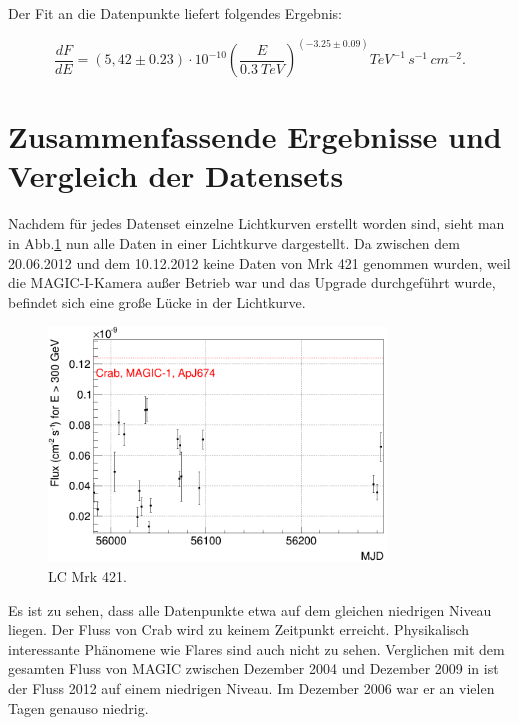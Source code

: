 Der Fit an die Datenpunkte liefert folgendes Ergebnis:

\begin{equation}
 \frac{dF}{dE}=(5,42 \pm 0.23) \cdot 10^{-10}\left( \frac{E}{\SI{0,3}{TeV}} \right)^{(-3.25 \pm 0.09)} \si{TeV^{-1}\,s^{-1}\,cm^{-2}}.
\end{equation}

\FloatBarrier


\section{Zusammenfassende Ergebnisse und Vergleich der Datensets}
\label{LC_Alles}

Nachdem für jedes Datenset einzelne Lichtkurven erstellt worden sind, sieht man in Abb.\ref{Alles_LC_Mrk421} nun alle Daten in einer Lichtkurve dargestellt.
Da zwischen dem 20.06.2012 und dem 10.12.2012 keine Daten von Mrk 421 genommen wurden, weil die MAGIC-I-Kamera außer Betrieb war und das Upgrade durchgeführt wurde, befindet sich eine große Lücke in der Lichtkurve.

\begin{figure}
    \centering
    \includegraphics[width=0.8\textwidth]{./Plots/04_MrkAnalyse/Alles_LC.png}
    \caption{LC Mrk 421.}
    \label{Alles_LC_Mrk421}
\end{figure}

Es ist zu sehen, dass alle Datenpunkte etwa auf dem gleichen niedrigen Niveau liegen.
Der Fluss von Crab wird zu keinem Zeitpunkt erreicht. 
Physikalisch interessante Phänomene wie Flares sind auch nicht zu sehen.
Verglichen mit dem gesamten Fluss von MAGIC zwischen Dezember 2004 und Dezember 2009 in \cite{DissBackes} ist der Fluss 2012 auf einem niedrigen Niveau.
Im Dezember 2006 war er an vielen Tagen genauso niedrig.

